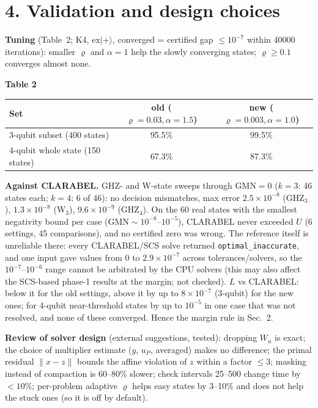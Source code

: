 \documentclass[10pt]{article}
\begin{document}
\section*{4. Validation and design choices}
\textbf{Tuning} (Table~2; K4, ex$|{+}\rangle$, converged = certified gap $\le10^{-7}$ within 40000 iterations): smaller $\varrho$ and $\alpha=1$ help the slowly converging states; $\varrho\ge0.1$ converges almost none.
\begin{center}\small\textbf{Table 2}\\[2pt]\begin{tabular}{lcc}\toprule
Set & old ($\varrho{=}0.03,\alpha{=}1.5$) & new ($\varrho{=}0.003,\alpha{=}1.0$)\\\midrule
3-qubit subset (400 states) & 95.5\% & 99.5\%\\
4-qubit whole state (150 states) & 67.3\% & 87.3\%\\\bottomrule
\end{tabular}\end{center}
\textbf{Against CLARABEL.} GHZ- and W-state sweeps through $\mathrm{GMN}=0$ ($k=3$: 46 states each; $k=4$: 6 of 46): no decision mismatches, max error $2.5\!\times\!10^{-8}$ (GHZ$_3$), $1.3\!\times\!10^{-8}$ (W$_3$), $9.6\!\times\!10^{-9}$ (GHZ$_4$). On the 60 real states with the smallest negativity bound per case ($\mathrm{GMN}\sim10^{-8}$--$10^{-5}$), CLARABEL never exceeded $U$ (6 settings, 45 comparisons), and no certified zero was wrong. The reference itself is unreliable there: every CLARABEL/SCS solve returned \texttt{optimal\_inaccurate}, and one input gave values from $0$ to $2.9\!\times\!10^{-7}$ across tolerances/solvers, so the $10^{-7}$--$10^{-6}$ range cannot be arbitrated by the CPU solvers (this may also affect the SCS-based phase-1 results at the margin; not checked). $L$ vs CLARABEL: below it for the old settings, above it by up to $8\!\times\!10^{-7}$ (3-qubit) for the new ones; for 4-qubit near-threshold states by up to $10^{-5}$ in one case that was not resolved, and none of these converged. Hence the margin rule in Sec.~2.

\textbf{Review of solver design} (external suggestions, tested): dropping $W_u$ is exact; the choice of multiplier estimate ($y$, $u_P$, averaged) makes no difference; the primal residual $\|x-z\|$ bounds the affine violation of $z$ within a factor $\le 3$; masking instead of compaction is 60--80\% slower; check intervals 25--500 change time by $<10\%$; per-problem adaptive $\varrho$ helps easy states by 3--10\% and does not help the stuck ones (so it is off by default).
\end{document}
